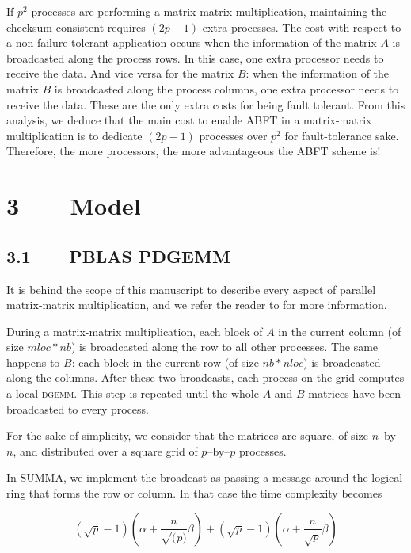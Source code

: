 \documentclass[pdftex,11pt]{article}
\begin{document}
If $p^2$ processes are performing a matrix-matrix multiplication,
maintaining the checksum consistent requires $(2p-1)$ extra processes.
The cost with respect to a non-failure-tolerant application occurs
when the information of the matrix $A$ is broadcasted along the
process rows. In this case, one extra processor needs to receive the
data. And vice versa for the matrix $B$: when the information of the
matrix $B$ is broadcasted along the process columns, one extra
processor needs to receive the data. These are the only extra costs
for being fault tolerant.
From this analysis, we deduce that the main cost to enable ABFT in a
matrix-matrix multiplication is to dedicate $(2p-1)$ processes over
$p^2$ for fault-tolerance sake. Therefore, the more processors, the
more advantageous the ABFT scheme is!


\section*{\color{DodgerBlue4}3~~~~Model}


\subsection*{\color{DodgerBlue4}3.1~~~~PBLAS PDGEMM}

It is behind the scope of this manuscript to describe every aspect of
parallel matrix-matrix multiplication, and we refer the reader to
\cite{GeWa:97} for more information.

During a matrix-matrix multiplication, each block of $A$ in the
current column (of size $mloc*nb$) is broadcasted along the row to all
other processes. The same happens to $B$: each block in the current
row (of size $nb*nloc$) is broadcasted along the columns. After these
two broadcasts, each process on the grid computes a local
\textsc{dgemm}. This step is repeated until the whole $A$ and $B$
matrices have been broadcasted to every process.

For the sake of simplicity, we consider that the matrices are square,
of size $n$--by--$n$, and distributed over a square grid of
$p$--by--$p$ processes.

In SUMMA, we implement the broadcast as passing a message around the
logical ring that forms the row or column. In that case the time
complexity becomes

\begin{equation}
(\sqrt{p}-1)(\alpha + \frac{n}{\sqrt(p)}\beta)+(\sqrt{p}-1)(\alpha+\frac{n}{\sqrt{p}}\beta)
\label{eq:summa1}
\end{equation}
\end{document}
